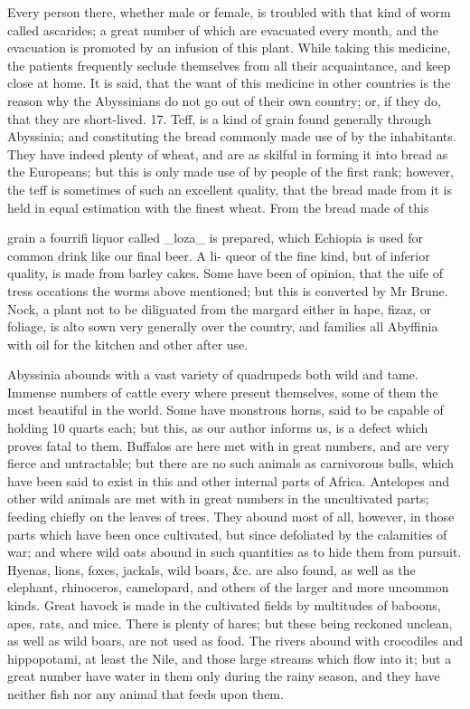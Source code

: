 \documentclass{article}
\begin{document}
Every person there, whether male or female, is troubled with that kind of worm called ascarides; a great number of which are evacuated every month, and the evacuation is promoted by an infusion of this plant. While taking this medicine, the patients frequently seclude themselves from all their acquaintance, and keep close at home. It is said, that the want of this medicine in other countries is the reason why the Abyssinians do not go out of their own country; or, if they do, that they are short-lived. 17. Teff, is a kind of grain found generally through Abyssinia; and constituting the bread commonly made use of by the inhabitants. They have indeed plenty of wheat, and are as skilful in forming it into bread as the Europeans; but this is only made use of by people of the first rank; however, the teff is sometimes of such an excellent quality, that the bread made from it is held in equal estimation with the finest wheat. From the bread made of this

grain a fourrifi liquor called \_loza\_ is prepared, which Echiopia is used for common drink like our final beer. A li- queor of the fine kind, but of inferior quality, is made from barley cakes. Some have been of opinion, that the uife of tress occations the worms above mentioned; but this is converted by Mr Brune. Nock, a plant not to be diliguated from the margard either in hape, fizaz, or foliage, is alto sown very generally over the country, and families all Abyffinia with oil for the kitchen and other after use.

Abyssinia abounds with a vast variety of quadrupeds both wild and tame. Immense numbers of cattle every where present themselves, some of them the most beautiful in the world. Some have monstrous horns, said to be capable of holding 10 quarts each; but this, as our author informs us, is a defect which proves fatal to them. Buffalos are here met with in great numbers, and are very fierce and untractable; but there are no such animals as carnivorous bulls, which have been said to exist in this and other internal parts of Africa. Antelopes and other wild animals are met with in great numbers in the uncultivated parts; feeding chiefly on the leaves of trees. They abound most of all, however, in those parts which have been once cultivated, but since defoliated by the calamities of war; and where wild oats abound in such quantities as to hide them from pursuit. Hyenas, lions, foxes, jackals, wild boars, \&c. are also found, as well as the elephant, rhinoceros, camelopard, and others of the larger and more uncommon kinds. Great havock is made in the cultivated fields by multitudes of baboons, apes, rats, and mice. There is plenty of hares; but these being reckoned unclean, as well as wild boars, are not used as food. The rivers abound with crocodiles and hippopotami, at least the Nile, and those large streams which flow into it; but a great number have water in them only during the rainy season, and they have neither fish nor any animal that feeds upon them.
\end{document}
